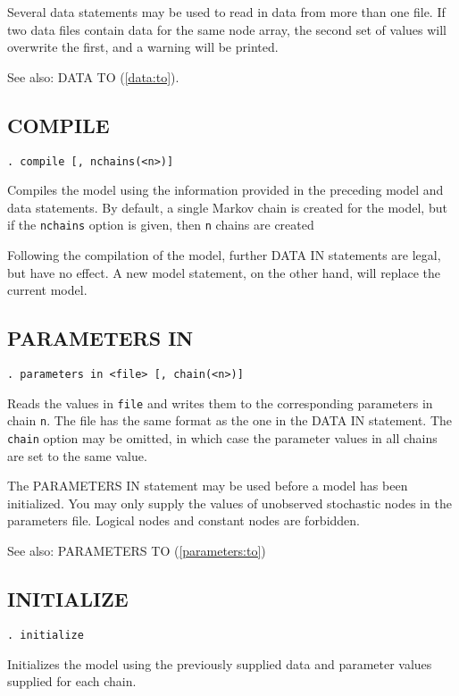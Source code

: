 \documentclass[11pt, a4paper, titlepage]{report}
\begin{document}
Several data statements may be used to read in data from more than one
file. If two data files contain data for the same node array, the second
set of values will overwrite the first, and a warning will be printed.

See also: DATA TO (\ref{data:to}).

\subsection{COMPILE}

\begin{verbatim}
. compile [, nchains(<n>)]
\end{verbatim}
Compiles the model using the information provided in the preceding
model and data statements. By default, a single Markov chain is
created for the model, but if the \texttt{nchains} option is given,
then \texttt{n} chains are created 

Following the compilation of the model, further DATA IN statements are
legal, but have no effect.  A new model statement, on the other hand,
will replace the current model.

\subsection{PARAMETERS IN}
\label{parameters:in}

\begin{verbatim}
. parameters in <file> [, chain(<n>)]
\end{verbatim}
Reads the values in \texttt{file} and writes them to the corresponding
parameters in chain \texttt{n}. The file has the same format as the
one in the DATA IN statement.  The \texttt{chain} option may be
omitted, in which case the parameter values in all chains are set to
the same value.

The PARAMETERS IN statement may be used before a model has been
initialized.  You may only supply the values of unobserved stochastic
nodes in the parameters file. Logical nodes and constant nodes are
forbidden.

See also: PARAMETERS TO (\ref{parameters:to})

\subsection{INITIALIZE}

\begin{verbatim}
. initialize
\end{verbatim}
Initializes the model using the previously supplied data and parameter
values supplied for each chain.
\end{document}
